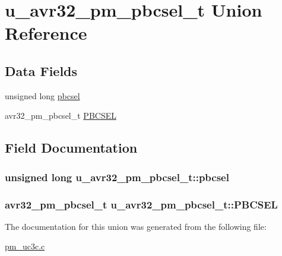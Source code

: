 \hypertarget{unionu__avr32__pm__pbcsel__t}{
\section{u\-\_\-avr32\-\_\-pm\-\_\-pbcsel\-\_\-t \-Union \-Reference}
\label{unionu__avr32__pm__pbcsel__t}
}
\subsection*{\-Data \-Fields}
\begin{DoxyCompactItemize}
\item 
unsigned long \hyperlink{unionu__avr32__pm__pbcsel__t_a8fdb6b1d404090d3bda1c53cb11abecc}{pbcsel}
\item 
avr32\-\_\-pm\-\_\-pbcsel\-\_\-t \hyperlink{unionu__avr32__pm__pbcsel__t_a85116f16fd8553ddcdf7c14a0ade90ba}{\-P\-B\-C\-S\-E\-L}
\end{DoxyCompactItemize}


\subsection{\-Field \-Documentation}
\hypertarget{unionu__avr32__pm__pbcsel__t_a8fdb6b1d404090d3bda1c53cb11abecc}{
\subsubsection[{pbcsel}]{\setlength{\rightskip}{0pt plus 5cm}unsigned long {\bf u\-\_\-avr32\-\_\-pm\-\_\-pbcsel\-\_\-t\-::pbcsel}}}
\label{unionu__avr32__pm__pbcsel__t_a8fdb6b1d404090d3bda1c53cb11abecc}
\hypertarget{unionu__avr32__pm__pbcsel__t_a85116f16fd8553ddcdf7c14a0ade90ba}{
\subsubsection[{\-P\-B\-C\-S\-E\-L}]{\setlength{\rightskip}{0pt plus 5cm}avr32\-\_\-pm\-\_\-pbcsel\-\_\-t {\bf u\-\_\-avr32\-\_\-pm\-\_\-pbcsel\-\_\-t\-::\-P\-B\-C\-S\-E\-L}}}
\label{unionu__avr32__pm__pbcsel__t_a85116f16fd8553ddcdf7c14a0ade90ba}


\-The documentation for this union was generated from the following file\-:\begin{DoxyCompactItemize}
\item 
\hyperlink{pm__uc3c_8c}{pm\-\_\-uc3c.\-c}\end{DoxyCompactItemize}
